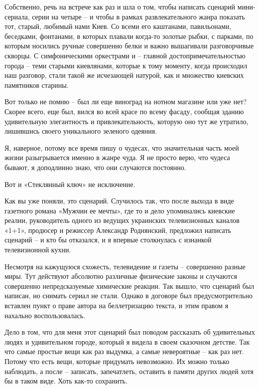 Собственно, речь на встрече как раз и шла о том, чтобы написать сценарий
мини-сериала, серии на четыре – и чтобы в рамках развлекательного жанра
показать тот, старый, любимый нами Киев. Со всеми его каштанами, павильонами,
беседками, фонтанами, в которых плавали когда-то золотые рыбки, с парками, по
которым носились ручные совершенно белки и важно вышагивали разговорчивые
скворцы. С симфоническими оркестрами и – главной достопримечательностью города
– теми старыми киевлянами, которые к тому моменту, когда происходил наш
разговор, стали такой же исчезающей натурой, как и множество киевских
памятников старины.

Вот только не помню – был ли еще виноград на нотном магазине или уже нет?
Скорее всего, еще был, вился во всей красе по всему фасаду, сообщая зданию
удивительную элегантность и привлекательность, которую оно тут же утратило,
лишившись своего уникального зеленого одеяния.

Я, наверное, потому все время пишу о чудесах, что значительная часть моей жизни
разыгрывается именно в жанре чуда. Я не просто верю, что чудеса бывают, я
доподлинно знаю, что они случаются постоянно.

Вот и «Стеклянный ключ» не исключение.

Как вы уже поняли, это сценарий. Случилось так, что после выхода в виде
газетного романа «Мужчин ее мечты», где то и дело упоминались киевские реалии,
руководитель одного из ведущих украинских телевизионных каналов «1+1», продюсер
и режиссер Александр Роднянский, предложил написать сценарий – и кто бы
отказался, и я впервые столкнулась с изнанкой телевизионной кухни.

Несмотря на кажущуюся схожесть, телевидение и газеты – совершенно разные миры.
Тут действуют абсолютно различные физические законы и случаются совершенно
непредсказуемые химические реакции. Так вышло, что сценарий был написан, но
снимать сериал не стали. Однако в договоре был предусмотрительно вставлен пункт
о праве автора на беллетризацию текста, и этим правом я нахально
воспользовалась.

Дело в том, что для меня этот сценарий был поводом рассказать об удивительных
людях и удивительном городе, который я видела в своем сказочном детстве. Так
что самые простые вещи как раз выдумка, а самые невероятные – как раз нет.
Потому что есть вещи, которые придумать невозможно. Их можно только наблюдать,
а после – записать, запечатлеть, оставить в памяти других людей хотя бы в таком
виде. Хоть как-то сохранить.

